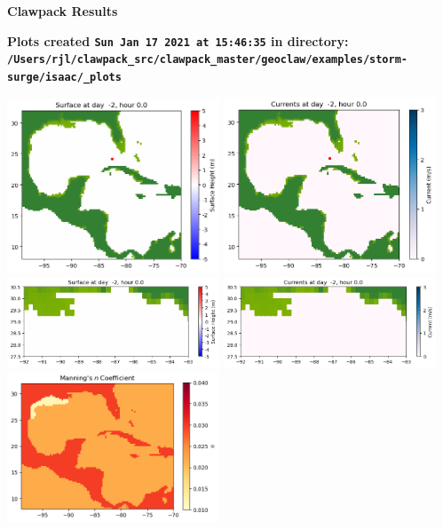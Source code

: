 \documentclass[11pt]{article}
\begin{document}
        \begin{center}{\Large\bf Clawpack Results}\vskip 5pt
        
        \bf Plots created {\tt Sun Jan 17 2021 at 15:46:35} in directory: \vskip 5pt
        \verb+/Users/rjl/clawpack_src/clawpack_master/geoclaw/examples/storm-surge/isaac/_plots+
        \end{center}
        \vskip 5pt
        \includegraphics[width=0.475\textwidth]{frame0000fig1001.png}
\includegraphics[width=0.475\textwidth]{frame0000fig1002.png}
\vskip 10pt 
\includegraphics[width=0.475\textwidth]{frame0000fig1003.png}
\includegraphics[width=0.475\textwidth]{frame0000fig1004.png}
\vskip 10pt 
\includegraphics[width=0.475\textwidth]{frame0000fig1005.png}
\end{document}
